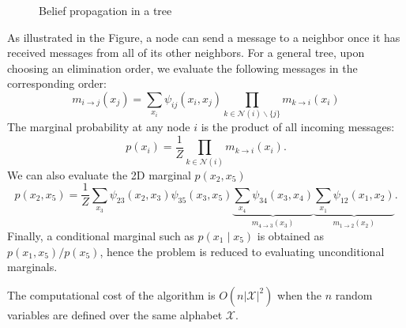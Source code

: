 \documentclass[11pt,a4paper]{article}
\begin{document}
\begin{enumerate}
\begin{center}
\begin{figure}[htbp]
        \caption{Belief propagation in a tree}
        \label{}
    \end{figure}\end{center}
    As illustrated in the Figure, a node can send a message to a neighbor once it has received messages from all of its other neighbors. For a general tree, upon choosing an elimination order, we evaluate the following messages in the corresponding order:
    $$
    m_{i \rightarrow j}\left(x_j\right)=\sum_{x_i} \psi_{i j}\left(x_i, x_j\right) \prod_{k \in \mathcal{N}(i) \backslash\{j\}} m_{k \rightarrow i}\left(x_i\right)
    $$
    The marginal probability at any node $i$ is the product of all incoming messages:
    $$
    p\left(x_i\right)=\frac{1}{Z} \prod_{k \in \mathcal{N}(i)} m_{k \rightarrow i}\left(x_i\right) .
    $$
    We can also evaluate the 2D marginal $p(x_2,x_5)$
    $$
    p\left(x_2, x_5\right)=\frac{1}{Z} \sum_{x_3} \psi_{23}\left(x_2, x_3\right) \psi_{35}\left(x_3, x_5\right) \underbrace{\sum_{x_4} \psi_{34}\left(x_3, x_4\right)}_{m_{4 \rightarrow 3}\left(x_3\right)} \underbrace{\sum_{x_1} \psi_{12}\left(x_1, x_2\right)}_{m_{1 \rightarrow 2}\left(x_2\right)} .
    $$
    Finally, a conditional marginal such as $p\left(x_1 \mid x_5\right)$ is obtained as $p\left(x_1, x_5\right) / p\left(x_5\right)$, hence the problem is reduced to evaluating unconditional marginals.

    The computational cost of the algorithm is $O\left(n|\mathcal{X}|^2\right)$ when the $n$ random variables are defined over the same alphabet $\mathcal{X}$.


\end{enumerate}
\end{document}
